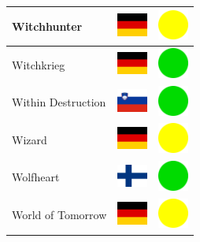 \documentclass[12pt, a4paper, twoside]{report}
\begin{document}
\begin{center}
\begin{longtable}{|p{5cm}|p{2cm}|p{2cm}|}
 Witchhunter                                                & \includegraphics[width=1cm]{../4x3/de} &   \includegraphics[width=1cm]{../likes/m} \\ \hline
 Witchkrieg                                                 & \includegraphics[width=1cm]{../4x3/de} &   \includegraphics[width=1cm]{../likes/y} \\ \hline
 Within Destruction                                         & \includegraphics[width=1cm]{../4x3/si} &   \includegraphics[width=1cm]{../likes/y} \\ \hline
 Wizard                                                     & \includegraphics[width=1cm]{../4x3/de} &   \includegraphics[width=1cm]{../likes/m} \\ \hline
 Wolfheart                                                  & \includegraphics[width=1cm]{../4x3/fi} &   \includegraphics[width=1cm]{../likes/y} \\ \hline
 World of Tomorrow                                          & \includegraphics[width=1cm]{../4x3/de} &   \includegraphics[width=1cm]{../likes/m} \\ \hline

\end{longtable}
\end{center}
\end{document}
